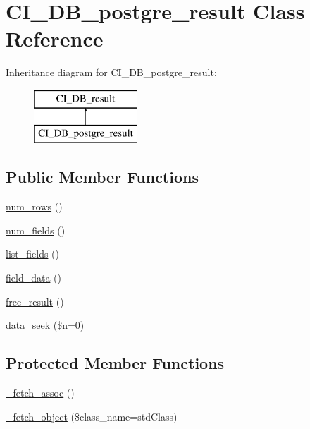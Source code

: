 \hypertarget{class_c_i___d_b__postgre__result}{}\section{C\+I\+\_\+\+D\+B\+\_\+postgre\+\_\+result Class Reference}
\label{class_c_i___d_b__postgre__result}
Inheritance diagram for C\+I\+\_\+\+D\+B\+\_\+postgre\+\_\+result\+:\begin{figure}[H]
\begin{center}
\leavevmode
\includegraphics[height=2.000000cm]{class_c_i___d_b__postgre__result}
\end{center}
\end{figure}
\subsection*{Public Member Functions}
\begin{DoxyCompactItemize}
\item 
\mbox{\hyperlink{class_c_i___d_b__postgre__result_ae11f2d750aa473b91963159d9dcf5ae3}{num\+\_\+rows}} ()
\item 
\mbox{\hyperlink{class_c_i___d_b__postgre__result_a68f3a55b4da62561eed8fe54126b10fe}{num\+\_\+fields}} ()
\item 
\mbox{\hyperlink{class_c_i___d_b__postgre__result_ab6a2ff88eb069db83fd229ffccfc85c6}{list\+\_\+fields}} ()
\item 
\mbox{\hyperlink{class_c_i___d_b__postgre__result_a3791773029bdf1d93f439ca4246a4549}{field\+\_\+data}} ()
\item 
\mbox{\hyperlink{class_c_i___d_b__postgre__result_a436d24fdfa704498cb6c6cfc4e9aa5de}{free\+\_\+result}} ()
\item 
\mbox{\hyperlink{class_c_i___d_b__postgre__result_a6596ba5122deba5a7e0599ea7535939d}{data\+\_\+seek}} (\$n=0)
\end{DoxyCompactItemize}
\subsection*{Protected Member Functions}
\begin{DoxyCompactItemize}
\item 
\mbox{\hyperlink{class_c_i___d_b__postgre__result_a33cfeb2a9f22a767acf5ee30bcdffa0f}{\+\_\+fetch\+\_\+assoc}} ()
\item 
\mbox{\hyperlink{class_c_i___d_b__postgre__result_a3d62a8d5a4b9c03fb2603da073c67507}{\+\_\+fetch\+\_\+object}} (\$class\+\_\+name=\textquotesingle{}std\+Class\textquotesingle{})
\end{DoxyCompactItemize}
